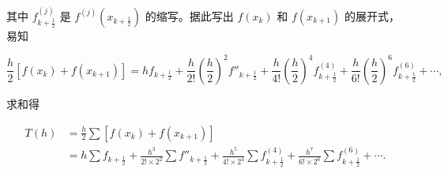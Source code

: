 其中 \(f^{(j)}_{k+\frac12}\) 是 \(f^{(j)}(x_{k+\frac12})\) 的缩写。据此写出 \(f(x_k)\) 和 \(f(x_{k+1})\) 的展开式，易知

\[
\frac h2[f(x_k)+f(x_{k+1})]
=hf_{k+\frac12}+\frac h{2!}\left(\frac h2\right)^2f''_{k+\frac12}
+\frac h{4!}\left(\frac h2\right)^4f^{(4)}_{k+\frac12}
+\frac h{6!}\left(\frac h2\right)^6f^{(6)}_{k+\frac12}+\cdots,
\]

求和得

\[
\begin{aligned}
T(h)&=\frac h2\sum[f(x_k)+f(x_{k+1})]\\
&=h\sum f_{k+\frac12}+\frac{h^3}{2!\times2^2}\sum f''_{k+\frac12}
+\frac{h^5}{4!\times2^4}\sum f^{(4)}_{k+\frac12}
+\frac{h^7}{6!\times2^6}\sum f^{(6)}_{k+\frac12}+\cdots.
\end{aligned}
\tag{4.3.15}
\]

